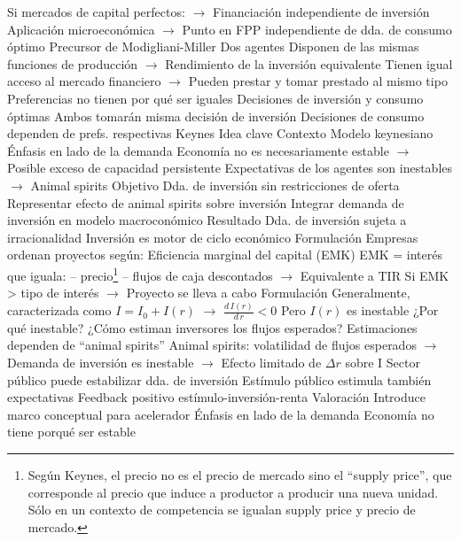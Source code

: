 \documentclass{nuevotema}
\begin{document}
\begin{esquemal}
				\4 Si mercados de capital perfectos:
				\4[] $\to$ Financiación independiente de inversión
				\4 Aplicación microeconómica
				\4[] $\to$ Punto en FPP independiente de dda. de consumo óptimo
				\4 Precursor de Modigliani-Miller
				\4 Dos agentes
				\4[] Disponen de las mismas funciones de producción
				\4[] $\to$ Rendimiento de la inversión equivalente
				\4[] Tienen igual acceso al mercado financiero
				\4[] $\to$ Pueden prestar y tomar prestado al mismo tipo
				\4[] Preferencias no tienen por qué ser iguales
				\4 Decisiones de inversión y consumo óptimas
				\4[] Ambos tomarán misma decisión de inversión
				\4[] Decisiones de consumo dependen de prefs. respectivas
		\2 Keynes
			\3 Idea clave
				\4 Contexto
				\4[] Modelo keynesiano
				\4[] Énfasis en lado de la demanda
				\4[] Economía no es necesariamente estable
				\4[] $\to$ Posible exceso de capacidad persistente
				\4[] Expectativas de los agentes son inestables
				\4[] $\to$ Animal spirits
				\4 Objetivo
				\4[] Dda. de inversión sin restricciones de oferta
				\4[] Representar efecto de animal spirits sobre inversión
				\4[] Integrar demanda de inversión en modelo macroconómico
				\4 Resultado
				\4[] Dda. de inversión sujeta a irracionalidad
				\4[] Inversión es motor de ciclo económico
			\3 Formulación
				\4 Empresas ordenan proyectos según:
				\4[] Eficiencia marginal del capital (EMK)
				\4[] EMK = interés que iguala:
				\4[] -- precio\footnote{Según Keynes, el precio no es el precio de mercado sino el ``supply price'', que corresponde al precio que induce a productor a producir una nueva unidad. Sólo en un contexto de competencia se igualan supply price y precio de mercado.}
				\4[] -- flujos de caja descontados
				\4[] $\to$ Equivalente a TIR
				\4[] Si EMK > tipo de interés
				\4[] $\to$ Proyecto se lleva a cabo
				\4 Formulación
				\4[] Generalmente, caracterizada como $I = I_0 + I(r)$
				\4[] $\to$ $\frac{d \, I(r)}{d \, r} < 0$
				\4[] Pero $I(r)$ es inestable
				\4 ¿Por qué inestable?
				\4[] ¿Cómo estiman inversores los flujos esperados?
				\4[] Estimaciones dependen de ``animal spirits''
				\4[] Animal spirits: volatilidad de flujos esperados
				\4[] $\to$ Demanda de inversión es inestable
				\4[] $\to$ Efecto limitado de $\Delta r$ sobre I
				\4[$\then$] Sector público puede estabilizar dda. de inversión
				\4[$\then$] Estímulo público estimula también expectativas
				\4[$\then$] Feedback positivo estímulo-inversión-renta
			\3 Valoración
				\4 Introduce marco conceptual para acelerador
				\4 Énfasis en lado de la demanda
				\4 Economía no tiene porqué ser estable

\end{esquemal}
\end{document}
